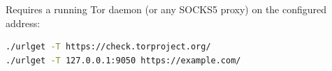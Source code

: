 \FullSourceStop

Requires a running Tor daemon (or any SOCKS5 proxy) on the configured
address:

\begin{lstlisting}[style=snippet,language=bash]
./urlget -T https://check.torproject.org/
./urlget -T 127.0.0.1:9050 https://example.com/
\end{lstlisting}
